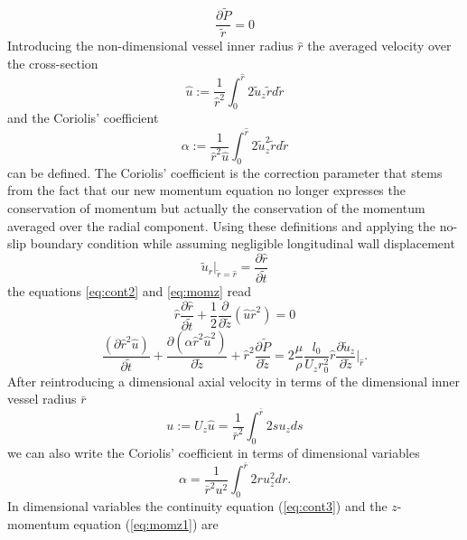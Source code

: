 \documentclass[a4paper, oneside]{discothesis}
\begin{document}
\begin{equation}
	\frac{\partial \tilde{P}}{\tilde{r}} = 0
\end{equation}
Introducing the non-dimensional vessel inner radius $\hat r$ the averaged velocity over the cross-section
\begin{equation}
	\hat{u} := \frac{1}{\hat{r}^2} \int_0^{\hat{r}} 2 \tilde{u}_z \tilde{r} d\tilde{r}
\end{equation}
and the Coriolis' coefficient
\begin{equation}
	\alpha := \frac{1}{\hat{r}^2 \hat{u}} \int_0^{\hat{r}} 2 \tilde{u}_z^2 \tilde{r} d\tilde{r}
\end{equation}
can be defined.
The Coriolis' coefficient is the correction parameter that stems from the fact that our new momentum equation no longer expresses the conservation of momentum but actually the conservation of the momentum averaged over the radial component.\cite{article10002407}
Using these definitions and applying the no-slip boundary condition while assuming negligible longitudinal wall displacement
\begin{equation}
	\tilde{u}_r|_{\tilde{r}=\hat{r}} = \frac{\partial \hat{r}}{\partial \tilde{t}}
\end{equation}
the equations \autoref{eq:cont2} and \autoref{eq:momz} read
\begin{equation}
	\hat{r} \frac{\partial \hat{r}}{\partial \tilde{t}} + \frac{1}{2}\frac{\partial}{\partial \tilde{z}} \left(  \hat{u}\hat{r}^2 \right) = 0 \label{eq:cont3}
\end{equation}
\begin{equation}
	\frac{(\partial \hat{r}^2 \hat{u})}{\partial \tilde{t}} + \frac{\partial \left( \alpha \hat{r}^2 \hat{u}^2 \right)}{\partial \tilde{z}} + \hat{r}^2 \frac{\partial \tilde{P}}{\partial \tilde{z}} = 2\frac{\mu}{\rho} \frac{l_0}{U_z r_0^2} \hat{r} \frac{\partial \tilde{u}_z}{\partial \tilde{z}} |_{\hat{r}}.\label{eq:momz1}
\end{equation}
After reintroducing a dimensional axial velocity in terms of the dimensional inner vessel radius $\bar{r}$
\begin{equation}
	u := U_z \hat{u} = \frac{1}{\bar{r}^2} \int_0^{\bar{r}} 2su_zds
\end{equation}
we can also write the Coriolis' coefficient in terms of dimensional variables
\begin{equation}
	\alpha = \frac{1}{\bar{r}^2 u^2} \int_0^{\bar{r}} 2ru_z^2dr.
\end{equation}
In dimensional variables the continuity equation (\autoref{eq:cont3}) and the $z$-momentum equation (\autoref{eq:momz1}) are
\end{document}
